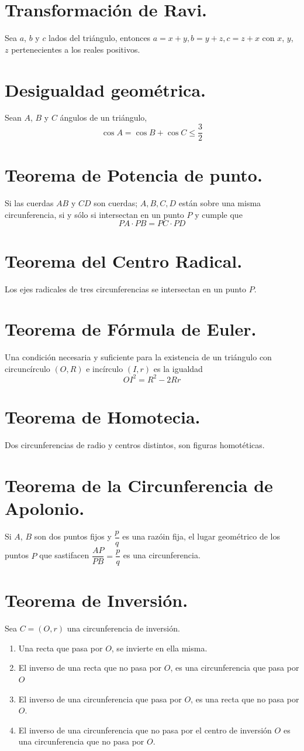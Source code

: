 \documentclass[12pt,a4paper,oneside]{book}
\begin{document}
\section{Transformación de Ravi.}
Sea $a$, $b$ y $c$ lados del triángulo, entonces $a=x+y, b=y+z, c=z+x$ con $x$, $y$, $z$ pertenecientes a los reales positivos.
\section{Desigualdad geométrica.}
Sean $A$, $B$ y $C$ ángulos de un triángulo, $$\cos A =\cos B +\cos C \leq \dfrac{3}{2}$$ 
\section{Teorema de Potencia de punto.}
Si las cuerdas $AB$ y $CD$ son cuerdas; $A, B, C, D$ están sobre una misma circunferencia, si y sólo si intersectan en un punto $P$ y cumple que $$PA \cdot PB = PC \cdot PD$$
\section{Teorema del Centro Radical.}
Los ejes radicales de tres circunferencias se intersectan en un punto $P$.
\section{Teorema de Fórmula de Euler.}
Una condición necesaria y suficiente para la existencia de un triángulo con circuncírculo $( O, R)$ e incírculo $(I, r)$ es la igualdad $$OI ^2= R^2 - 2Rr$$
\section{Teorema de Homotecia.}
Dos circunferencias de radio  y centros distintos, son figuras homotéticas.
\section{Teorema de la Circunferencia de Apolonio.}
Si $A$, $B$ son dos puntos fijos y $\dfrac{p}{q}$ es una razóin fija, el lugar geométrico de los puntos $P$ que sastifacen $\dfrac{AP}{PB}=\dfrac{p}{q}$ es una circunferencia.
\section{Teorema de Inversión.}
Sea $C=(O, r)$ una circunferencia de inversión. 
\begin{enumerate}
\item Una recta que pasa por $O$, se invierte en ella misma.
\item El inverso de una recta que no pasa por $O$, es una circunferencia que pasa por $O$
\item El inverso de una circunferencia que pasa por $O$, es una recta que no pasa por $O$.
\item El inverso de una circunferencia que no pasa por el centro de inversión $O$ es una circunferencia que no pasa por $O$.
\end{enumerate}
\end{document}
